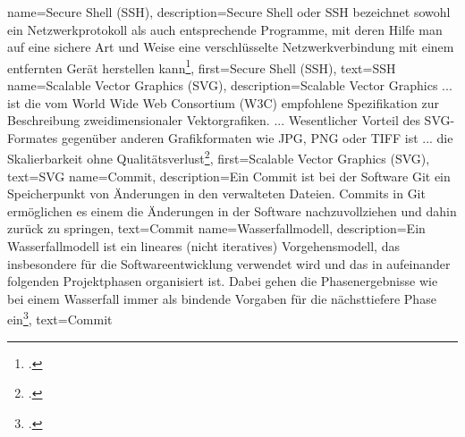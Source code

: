 {
    name={Secure Shell (SSH)},
    description={Secure Shell oder SSH bezeichnet sowohl ein Netzwerkprotokoll
      als auch entsprechende Programme, mit deren Hilfe man auf eine sichere Art und
      Weise eine verschlüsselte Netzwerkverbindung mit einem entfernten Gerät
      herstellen kann\footcite{ssh}},
    first={Secure Shell (SSH)},
    text={SSH}
}
{
    name={Scalable Vector Graphics (SVG)},
    description={Scalable Vector Graphics ... ist die vom World Wide Web
      Consortium (W3C) empfohlene Spezifikation zur Beschreibung
      zweidimensionaler Vektorgrafiken. ... Wesentlicher Vorteil des
      SVG-Formates gegenüber anderen Grafikformaten wie JPG, PNG oder TIFF ist
      ... die Skalierbarkeit ohne Qualitätsverlust\footcite{svg}},
    first={Scalable Vector Graphics (SVG)},
    text={SVG}
}
{
    name={Commit},
    description={Ein Commit ist bei der Software Git ein Speicherpunkt von
      Änderungen in den verwalteten Dateien. Commits in Git ermöglichen es
      einem die Änderungen in der Software nachzuvollziehen und dahin zurück zu
      springen},
    text={Commit}
}
{
    name={Wasserfallmodell},
    description={Ein Wasserfallmodell ist ein lineares (nicht iteratives)
      Vorgehensmodell, das insbesondere für die Softwareentwicklung verwendet wird
      und das in aufeinander folgenden Projektphasen organisiert ist. Dabei gehen die
      Phasenergebnisse wie bei einem Wasserfall immer als bindende Vorgaben für die
      nächsttiefere Phase ein\footcite{wasserfall}},
    text={Commit}
}
